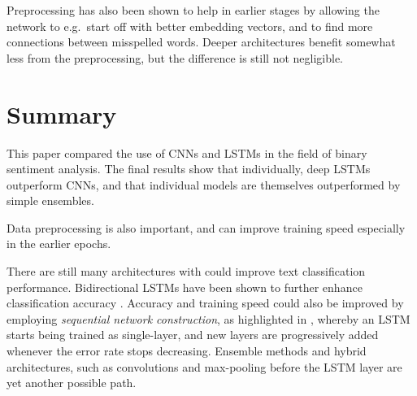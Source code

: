\documentclass[10pt,conference,compsocconf]{IEEEtran}
\begin{document}
Preprocessing has also been shown to help in earlier stages by allowing
the network to e.g.\ start off with better embedding vectors, and to
find more connections between misspelled words. Deeper architectures benefit
somewhat less from the preprocessing, but the difference is still not
negligible.


\section{Summary}
\label{sec:summary}

This paper compared the use of CNNs and LSTMs in the field of binary sentiment
analysis. The final results show that individually, deep LSTMs outperform CNNs,
and that individual models are themselves outperformed by simple ensembles.

Data preprocessing is also important, and can improve training speed especially
in the earlier epochs.

There are still many architectures with could improve text classification
performance. Bidirectional LSTMs have been shown to further enhance 
classification accuracy \cite{zhao2016online}. Accuracy and training speed
could also be improved by employing
\textit{sequential network construction}, as highlighted in \cite{hochreiter1997lstm,fahlman1991recurrent},
whereby an LSTM starts being trained as single-layer, and new layers
are progressively added whenever the error rate stops decreasing.
Ensemble methods and hybrid architectures, such as convolutions and max-pooling
before the LSTM layer are yet another possible path.



\end{document}
